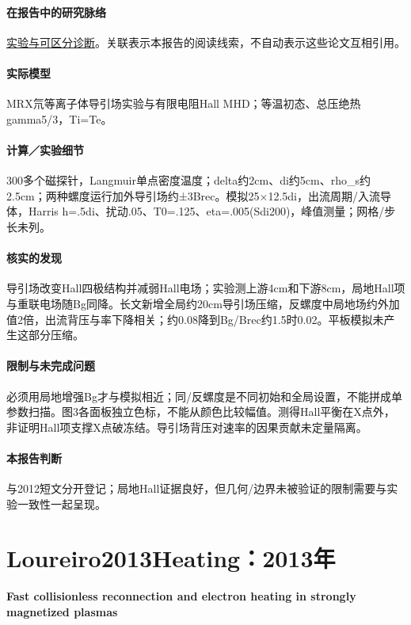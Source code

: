 \paragraph{在报告中的研究脉络}\hyperref[story:diagnostic]{实验与可区分诊断}。关联表示本报告的阅读线索，不自动表示这些论文互相引用。

\paragraph{实际模型}MRX氘等离子体导引场实验与有限电阻Hall MHD；等温初态、总压绝热gamma5/3，Ti=Te。

\paragraph{计算／实验细节}300多个磁探针，Langmuir单点密度温度；delta约2cm、di约5cm、rho\_s约2.5cm；两种螺度运行加外导引场约±3Brec。模拟25×12.5di，出流周期/入流导体，Harris h=.5di、扰动.05、T0=.125、eta=.005(Sdi200)，峰值测量；网格/步长未列。

\paragraph{核实的发现}导引场改变Hall四极结构并减弱Hall电场；实验测上游4cm和下游8cm，局地Hall项与重联电场随Bg同降。长文新增全局约20cm导引场压缩，反螺度中局地场约外加值2倍，出流背压与率下降相关；约0.08降到Bg/Brec约1.5时0.02。平板模拟未产生这部分压缩。

\paragraph{限制与未完成问题}必须用局地增强Bg才与模拟相近；同/反螺度是不同初始和全局设置，不能拼成单参数扫描。图3各面板独立色标，不能从颜色比较幅值。测得Hall平衡在X点外，非证明Hall项支撑X点破冻结。导引场背压对速率的因果贡献未定量隔离。

\paragraph{本报告判断}与2012短文分开登记；局地Hall证据良好，但几何/边界未被验证的限制需要与实验一致性一起呈现。

\section{Loureiro2013Heating：2013年}\label{paper:Loureiro2013Heating}

\textbf{Fast collisionless reconnection and electron heating in strongly magnetized plasmas}\citep{Loureiro2013Heating}\

